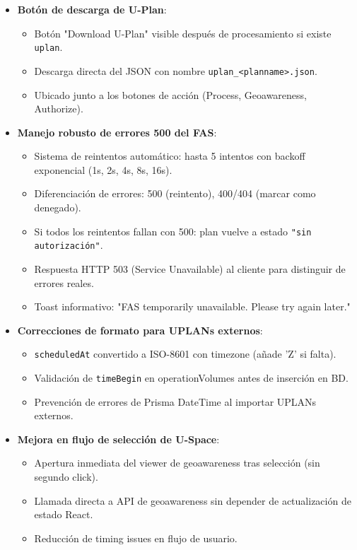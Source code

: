 \documentclass[12pt,a4paper]{article}
\begin{document}
\begin{itemize}
\begin{itemize}
    \end{itemize}
    \item \textbf{Botón de descarga de U-Plan}:
    \begin{itemize}
        \item Botón "Download U-Plan" visible después de procesamiento si existe \texttt{uplan}.
        \item Descarga directa del JSON con nombre \texttt{uplan\_<planname>.json}.
        \item Ubicado junto a los botones de acción (Process, Geoawareness, Authorize).
    \end{itemize}
    \item \textbf{Manejo robusto de errores 500 del FAS}:
    \begin{itemize}
        \item Sistema de reintentos automático: hasta 5 intentos con backoff exponencial (1s, 2s, 4s, 8s, 16s).
        \item Diferenciación de errores: 500 (reintento), 400/404 (marcar como denegado).
        \item Si todos los reintentos fallan con 500: plan vuelve a estado \texttt{"sin autorización"}.
        \item Respuesta HTTP 503 (Service Unavailable) al cliente para distinguir de errores reales.
        \item Toast informativo: "FAS temporarily unavailable. Please try again later."
    \end{itemize}
    \item \textbf{Correcciones de formato para UPLANs externos}:
    \begin{itemize}
        \item \texttt{scheduledAt} convertido a ISO-8601 con timezone (añade 'Z' si falta).
        \item Validación de \texttt{timeBegin} en operationVolumes antes de inserción en BD.
        \item Prevención de errores de Prisma DateTime al importar UPLANs externos.
    \end{itemize}
    \item \textbf{Mejora en flujo de selección de U-Space}:
    \begin{itemize}
        \item Apertura inmediata del viewer de geoawareness tras selección (sin segundo click).
        \item Llamada directa a API de geoawareness sin depender de actualización de estado React.
        \item Reducción de timing issues en flujo de usuario.
    \end{itemize}
\end{itemize}
\end{document}
